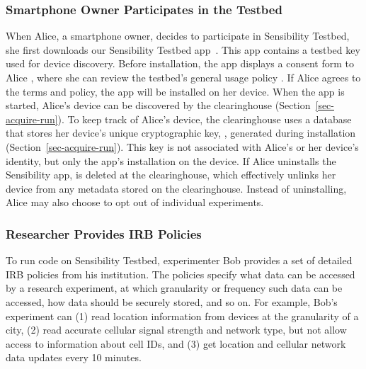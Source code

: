 \subsubsection{Smartphone Owner Participates in the Testbed}
\label{sec-owner-participate}

When Alice, a smartphone owner, decides to participate in
Sensibility Testbed, she first downloads our Sensibility Testbed
app~\cite{sensibility-app}. %
This app contains a testbed key  used for 
device discovery. %
Before installation, the app displays a
consent form to Alice , where she can review
the testbed's general usage policy . If Alice
agrees to the terms and policy, the app will be installed on her
device. When the app is started, Alice's device can be
discovered by the clearinghouse (Section~\ref{sec-acquire-run}). 
To keep track of Alice's device, the
clearinghouse uses a database that stores her device's unique
cryptographic key, , generated during installation 
(Section~\ref{sec-acquire-run}). This key is not associated with Alice's or her
device's identity, but only the app's installation on the device. If
Alice uninstalls the Sensibility app,  is
deleted at the clearinghouse, which effectively unlinks
her device from any metadata stored on the clearinghouse.
Instead of uninstalling, Alice may also choose to opt out of
individual experiments.

\subsubsection{Researcher Provides IRB
Policies}\label{sec-irb-policy}

To run code on Sensibility Testbed, experimenter Bob provides a
set of detailed IRB policies from his institution. The policies specify 
what data can be accessed by a research experiment, at which 
granularity or frequency such data can be accessed, how data 
should be securely stored, and so on. 
For example, Bob's experiment can (1) read location information
from devices at the granularity of a city, (2) read accurate
cellular signal strength and network type, but not allow access to 
information about cell IDs, and (3) get location and
cellular network data updates every 10 minutes. 


